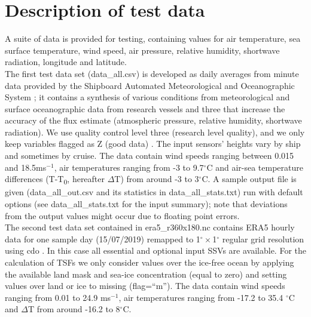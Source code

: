 \documentclass[letterpaper,10pt,english]{sphinxmanual}
\begin{document}
\section{Description of test data}
\label{\detokenize{index:description-of-test-data}}
A suite of data is provided for testing, containing values for air temperature, sea surface temperature, wind speed, air pressure, relative humidity, shortwave radiation, longitude and latitude.\\
The first test data set (data\_all.csv) is developed as daily averages from minute data provided by the Shipboard Automated Meteorological and Oceanographic System \cite[SAMOS,][]{Smith_etal_2019a, Smith_etal_2018} ; it contains a synthesis of various conditions from meteorological and surface oceanographic data from research vessels and three that increase the accuracy of the flux estimate (atmospheric pressure, relative humidity, shortwave radiation). We use quality control level three (research level quality), and we only keep variables flagged as Z (good data) \citep[for details on flag definitions see][]{Smith_etal_2018}. The input sensors' heights vary by ship and sometimes by cruise. The data contain wind speeds ranging between 0.015 and 18.5ms$^{-1}$, air temperatures ranging from -3 to 9.7$^{\circ}$C and air-sea temperature differences (T-T\textsubscript{0}, hereafter $\Delta$T) from around -3 to 3$^{\circ}$C. A sample output file is given (data\_all\_out.csv and its statistics in data\_all\_stats.txt) run with default options (see data\_all\_stats.txt for the input summary); note that deviations from the output values might occur due to floating point errors. \\
The second test data set contained in era5\_r360x180.nc contains ERA5 \citep{Hersbach_etal_2018, era5_doc} hourly data for one sample day (15/07/2019) remapped to 1$^{\circ}$\,$\times$\,1$^{\circ}$ regular grid resolution using cdo \citep{schulzweida_uwe_2019_3539275}. In this case all essential and optional input SSVs are available. For the calculation of TSFs we only consider values over the ice-free ocean by applying the available land mask and sea-ice concentration (equal to zero) and setting values over land or ice to missing (flag=``m''). The data contain wind speeds ranging from 0.01 to 24.9 ms$^{-1}$, air temperatures ranging from -17.2 to 35.4 $^{\circ}$C and $\Delta$T from around -16.2 to 8$^{\circ}$C.
\end{document}
